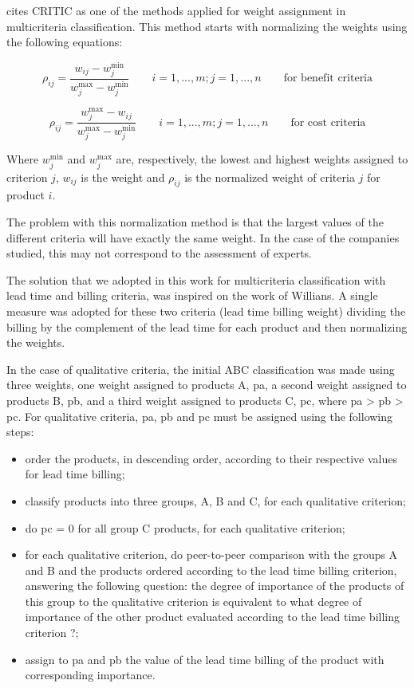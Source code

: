 \documentclass[10pt,fleqn,a4paper,twoside]{article}
\begin{document}
	\citet{Odu2019} cites CRITIC as one of the methods applied for weight assignment in multicriteria classification. This method starts with normalizing the weights using the following equations:
	
	\begin{equation}
		\rho_{ij} = \frac{w_{ij} - w_{j}^{\min}}{w_{j}^{\max} - w_{j}^{\min}} \qquad i=1,...,m; j = 1, ..., n \qquad \textrm{for benefit criteria}
	\end{equation}
	
	\begin{equation}
		\rho_{ij} = \frac{w_{j}^{\max} - w_{ij}}{w_{j}^{\max} - w_{j}^{\min}} \qquad i=1,...,m; j = 1, ..., n \qquad \textrm{for cost criteria}
	\end{equation}
	
	Where $w_{j}^{\min}$ and $w_{j}^{\max}$ are, respectively, the lowest and highest weights assigned to criterion $j$, $w_{ij}$ is the weight and $\rho_{ij}$ is the normalized weight of criteria $j$ for product $i$. 
	 
	The problem with this normalization method is that the largest values of the different criteria will have exactly the same weight. In the case of the companies studied, this may not correspond to the assessment of experts. 
	
	The solution that we adopted in this work for multicriteria classification with lead time and billing criteria, was inspired on the work of Willians. A single measure was adopted for these two criteria (lead time billing  weight) dividing the billing by the complement of the lead time for each product and then normalizing the weights.

In the case of qualitative criteria, the initial ABC classification was made using three weights, one weight assigned to products A, pa, a second weight assigned to products B, pb, and a third weight assigned to products C, pc, where pa > pb > pc. For qualitative criteria, pa, pb and pc must be assigned using the following steps:
	
\begin{itemize}
\item order the products, in descending order, according to their respective values for lead time billing;
\item classify products into three groups, A, B and C, for each qualitative criterion;
\item do pc = 0 for all group C products, for each qualitative criterion;
\item for each qualitative criterion, do peer-to-peer comparison with the groups A and B and the products ordered according to the lead time billing criterion, answering the following question: the degree of importance of the products of this group to the qualitative criterion is equivalent to what degree of importance of the other product evaluated according to the lead time billing criterion ?;
\item assign to pa and pb the value of the lead time billing of the product with corresponding importance.
\end{itemize}	
\end{document}
